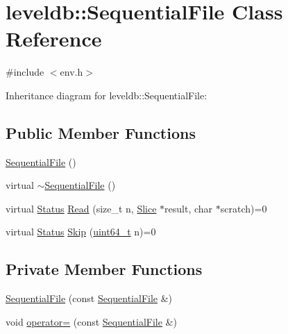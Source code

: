 \hypertarget{classleveldb_1_1_sequential_file}{\section{leveldb\-:\-:Sequential\-File Class Reference}
\label{classleveldb_1_1_sequential_file}
}


{\ttfamily \#include $<$env.\-h$>$}



Inheritance diagram for leveldb\-:\-:Sequential\-File\-:
\subsection*{Public Member Functions}
\begin{DoxyCompactItemize}
\item 
\hyperlink{classleveldb_1_1_sequential_file_a5df57658966ccab71b01f5134497fcf6}{Sequential\-File} ()
\item 
virtual \hyperlink{classleveldb_1_1_sequential_file_a90e768998dedfb7e9b3fa176478a2462}{$\sim$\-Sequential\-File} ()
\item 
virtual \hyperlink{classleveldb_1_1_status}{Status} \hyperlink{classleveldb_1_1_sequential_file_a4136bef1546cdb9fbbd477a635460261}{Read} (size\-\_\-t n, \hyperlink{classleveldb_1_1_slice}{Slice} $\ast$result, char $\ast$scratch)=0
\item 
virtual \hyperlink{classleveldb_1_1_status}{Status} \hyperlink{classleveldb_1_1_sequential_file_a18c94279fc058cad4d03cdfe04b12179}{Skip} (\hyperlink{stdint_8h_aaa5d1cd013383c889537491c3cfd9aad}{uint64\-\_\-t} n)=0
\end{DoxyCompactItemize}
\subsection*{Private Member Functions}
\begin{DoxyCompactItemize}
\item 
\hyperlink{classleveldb_1_1_sequential_file_afb228652afc2ff0e90fa6128dcdc0183}{Sequential\-File} (const \hyperlink{classleveldb_1_1_sequential_file}{Sequential\-File} \&)
\item 
void \hyperlink{classleveldb_1_1_sequential_file_a3ef59734da441c154f6287cf174347b4}{operator=} (const \hyperlink{classleveldb_1_1_sequential_file}{Sequential\-File} \&)
\end{DoxyCompactItemize}


